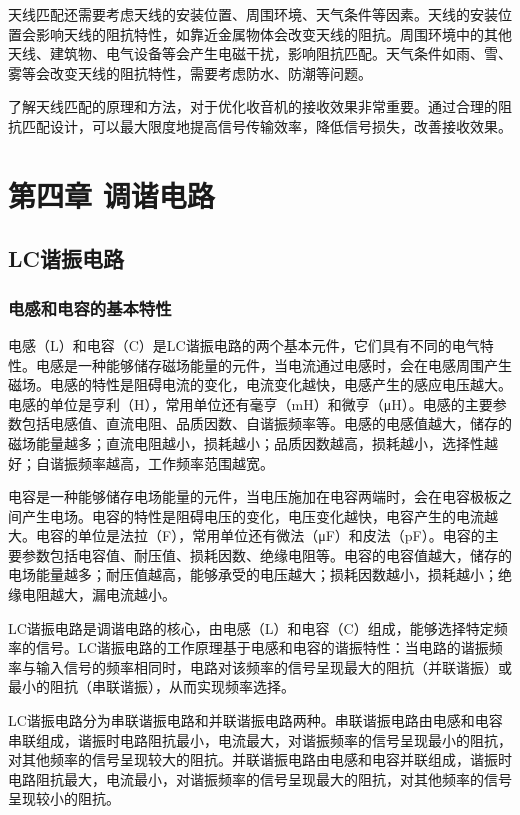 \documentclass[12pt,UTF8]{ctexbook}
\begin{document}
天线匹配还需要考虑天线的安装位置、周围环境、天气条件等因素。天线的安装位置会影响天线的阻抗特性，如靠近金属物体会改变天线的阻抗。周围环境中的其他天线、建筑物、电气设备等会产生电磁干扰，影响阻抗匹配。天气条件如雨、雪、雾等会改变天线的阻抗特性，需要考虑防水、防潮等问题。

了解天线匹配的原理和方法，对于优化收音机的接收效果非常重要。通过合理的阻抗匹配设计，可以最大限度地提高信号传输效率，降低信号损失，改善接收效果。

\chapter{第四章 调谐电路}

\section{LC谐振电路}

\subsection{电感和电容的基本特性}

电感（L）和电容（C）是LC谐振电路的两个基本元件，它们具有不同的电气特性。电感是一种能够储存磁场能量的元件，当电流通过电感时，会在电感周围产生磁场。电感的特性是阻碍电流的变化，电流变化越快，电感产生的感应电压越大。电感的单位是亨利（H），常用单位还有毫亨（mH）和微亨（μH）。电感的主要参数包括电感值、直流电阻、品质因数、自谐振频率等。电感的电感值越大，储存的磁场能量越多；直流电阻越小，损耗越小；品质因数越高，损耗越小，选择性越好；自谐振频率越高，工作频率范围越宽。

电容是一种能够储存电场能量的元件，当电压施加在电容两端时，会在电容极板之间产生电场。电容的特性是阻碍电压的变化，电压变化越快，电容产生的电流越大。电容的单位是法拉（F），常用单位还有微法（μF）和皮法（pF）。电容的主要参数包括电容值、耐压值、损耗因数、绝缘电阻等。电容的电容值越大，储存的电场能量越多；耐压值越高，能够承受的电压越大；损耗因数越小，损耗越小；绝缘电阻越大，漏电流越小。

LC谐振电路是调谐电路的核心，由电感（L）和电容（C）组成，能够选择特定频率的信号。LC谐振电路的工作原理基于电感和电容的谐振特性：当电路的谐振频率与输入信号的频率相同时，电路对该频率的信号呈现最大的阻抗（并联谐振）或最小的阻抗（串联谐振），从而实现频率选择。

LC谐振电路分为串联谐振电路和并联谐振电路两种。串联谐振电路由电感和电容串联组成，谐振时电路阻抗最小，电流最大，对谐振频率的信号呈现最小的阻抗，对其他频率的信号呈现较大的阻抗。并联谐振电路由电感和电容并联组成，谐振时电路阻抗最大，电流最小，对谐振频率的信号呈现最大的阻抗，对其他频率的信号呈现较小的阻抗。
\end{document}
